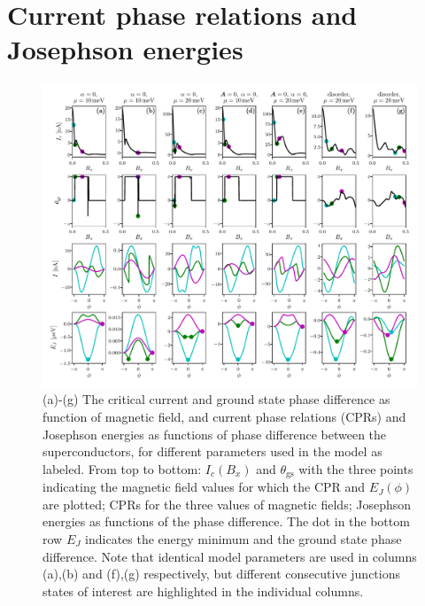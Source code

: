 \documentclass[english, aps,prb,showpacs,preprintnumber,amsmath,amssymb,superscriptaddress,reprint]{revtex4-1}
\begin{document}
\section{Current phase relations and Josephson energies}
\begin{figure}[!h]
\centering
\includegraphics[width=\textwidth]{figures/sup_fig8.pdf}
\caption{(a)-(g) The critical current and ground state phase difference as function of magnetic field, and current phase relations (CPRs) and Josephson energies as functions of phase difference between the superconductors, for different parameters used in the model as labeled.
From top to bottom: $I_c(B_x)$ and $\theta_{\textrm{gs}}$ with the three points indicating the magnetic field values for which the CPR and $E_J(\phi)$ are plotted; CPRs for the three values of magnetic fields; Josephson energies as functions of the phase difference.
The dot in the bottom row $E_J$ indicates the energy minimum and the ground state phase difference.
Note that identical model parameters are used in columns (a),(b) and (f),(g) respectively, but different consecutive junctions states of interest are highlighted in the individual columns. 
\label{fig:CPR}}
\end{figure}
\end{document}
